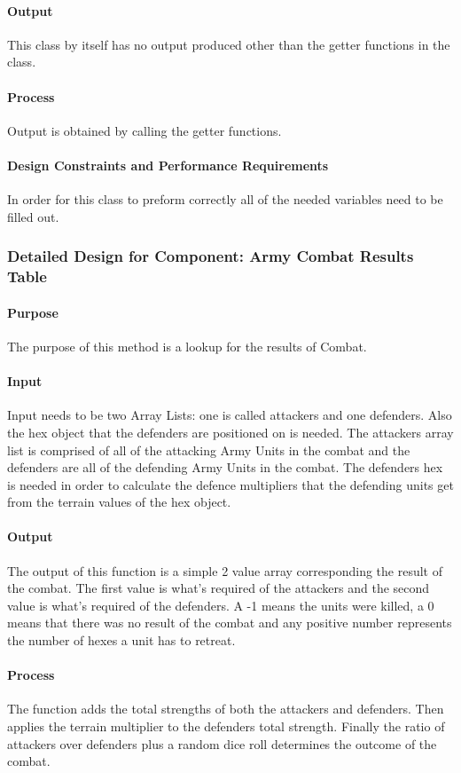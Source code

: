 \documentclass[12pt,a4paper,titlepage]{article}
\begin{document}
\paragraph{Output} This class by itself has no output produced other than the getter functions in the class.
\paragraph{Process} Output is obtained by calling the getter functions. 
\paragraph{Design Constraints and Performance Requirements}	In order for this class to preform correctly all of the needed variables need to be filled out.

\subsubsection{Detailed Design for Component: Army Combat Results Table}
\paragraph{Purpose} The purpose of this method is a lookup for the results of Combat. 
\paragraph{Input} Input needs to be two Array Lists: one is called attackers and one defenders. Also the hex object that the defenders are positioned on is needed. The attackers array list is comprised of all of the attacking Army Units in the combat and the defenders are all of the defending Army Units in the combat. The defenders hex is needed in order to calculate the defence multipliers that the defending units get from the terrain values of the hex object.
\paragraph{Output} The output of this function is a simple 2 value array corresponding the result of the combat. The first value is what's required of the attackers and the second value is what's required of the defenders. A -1 means the units were killed, a 0 means that there was no result of the combat and any positive number represents the number of hexes a unit has to retreat. 
\paragraph{Process} The function adds the total strengths of both the attackers and defenders. Then applies the terrain multiplier to the defenders total strength. Finally the ratio of attackers over defenders plus a random dice roll determines the outcome of the combat.  
\end{document}
